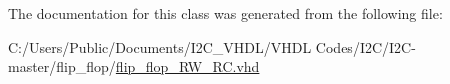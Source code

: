 The documentation for this class was generated from the following file\+:\begin{DoxyCompactItemize}
\item 
C\+:/\+Users/\+Public/\+Documents/\+I2\+C\+\_\+\+V\+H\+D\+L/\+V\+H\+D\+L Codes/\+I2\+C/\+I2\+C-\/master/flip\+\_\+flop/\hyperlink{flip__flop___r_w___r_c_8vhd}{flip\+\_\+flop\+\_\+\+R\+W\+\_\+\+R\+C.\+vhd}\end{DoxyCompactItemize}
